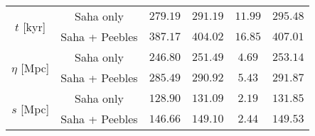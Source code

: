 \documentclass{aa}
\numberwithin{equation}{section}
\numberwithin{table}{section}
\numberwithin{figure}{section}
\begin{document}
\begin{table*}
\begin{tabular}{| c || c || c | c | c | c |}
  \hline 
  \multirow{2}{*}{$t$ [kyr]} & Saha only       & \hspace{1pt}$279.19$   & \hspace{1pt}$291.19$      & \hspace{-0.5pt}$11.99$        & \hspace{1pt}$295.48$    \\
  \cline{2-6}
                           & Saha + Peebles  & \hspace{1pt}$387.17$   & \hspace{1pt}$404.02$      & \hspace{-0.5pt}$16.85$      & \hspace{1pt}$407.01$    \\
  \hline 
  \multirow{2}{*}{$\eta$ [Mpc]} & Saha only       & \hspace{1pt}$246.80$   & \hspace{1pt}$251.49$      & \hspace{4.5pt}$4.69$        & \hspace{1pt}$253.14$    \\ 
  \cline{2-6}
                           & Saha + Peebles  & \hspace{1pt}$285.49$   & \hspace{1pt}$290.92$      & \hspace{4.5pt}$5.43$        & \hspace{1pt}$291.87$    \\ 
  \hline 
  \multirow{2}{*}{$s$ [Mpc]} & Saha only       & \hspace{1pt}$128.90$   & \hspace{1pt}$131.09$      & \hspace{4.5pt}$2.19$        & \hspace{1pt}$131.85$    \\ 
  \cline{2-6}
                           & Saha + Peebles  & \hspace{1pt}$146.66$   & \hspace{1pt}$149.10$      & \hspace{4.5pt}$2.44$        & \hspace{1pt}$149.53$    \\
  \hline                                   %
  \end{tabular}
\end{table*}
\end{document}
